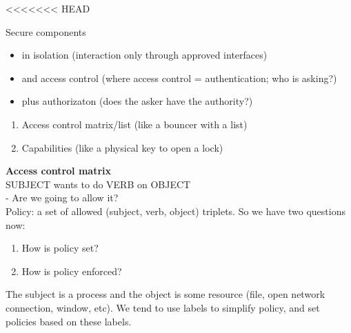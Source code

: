 <<<<<<< HEAD


Secure components
\begin{itemize}
    \item in isolation (interaction only through approved interfaces)
    \item and access control (where access control = authentication; who is asking?)
    \item plus authorizaton (does the asker have the authority?)
\end{itemize}

\begin{enumerate}
    \item Access control matrix/list (like a bouncer with a list)
    \item Capabilities (like a physical key to open a lock)
\end{enumerate}

\textbf{Access control matrix}\\
SUBJECT wants to do VERB on OBJECT\\
- Are we going to allow it?\\

Policy: a set of allowed (subject, verb, object) triplets. So we have two questions now:
\begin{enumerate}
    \item How is policy set?
    \item How is policy enforced?\\
\end{enumerate}

The subject is a process and the object is some resource (file, open network connection, window, etc). We tend to use labels to simplify policy, and set policies based on these labels.

